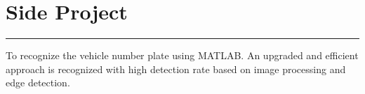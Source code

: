 \documentclass[]{meetresume-class}
\begin{document}
\begin{minipage}[t]{0.66\textwidth}
\begin{minipage}{0.85\textwidth\vspace{2pt}}
		\end{minipage}
		\section{Side Project}
		\noindent\rule{12.5cm}{0.4pt}
		 
		\noindent
		\hspace{5em}%
		\begin{minipage}{0.85\textwidth\vspace{5pt}}
			To recognize the vehicle number plate using MATLAB. An upgraded and
			efficient approach is recognized with high detection rate based on image
			processing and edge detection.
		\end{minipage}
	\end{minipage} 
\end{document}
